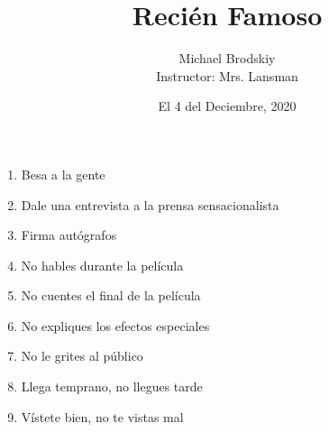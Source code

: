 \documentclass[12pt]{article}
\title{Reci\'en Famoso}
\date{El 4 del Deciembre, 2020}
\author{Michael Brodskiy\\ \small Instructor: Mrs. Lansman}
\begin{document}
\maketitle

\begin{enumerate}

  \item Besa a la gente

  \item Dale una entrevista a la prensa sensacionalista

  \item Firma aut\'ografos

  \item No hables durante la pel\'icula

  \item No cuentes el final de la pel\'icula
    
  \item No expliques los efectos especiales

  \item No le grites al p\'ublico

  \item Llega temprano, no llegues tarde

  \item V\'istete bien, no te vistas mal

\end{enumerate}
\end{document}
